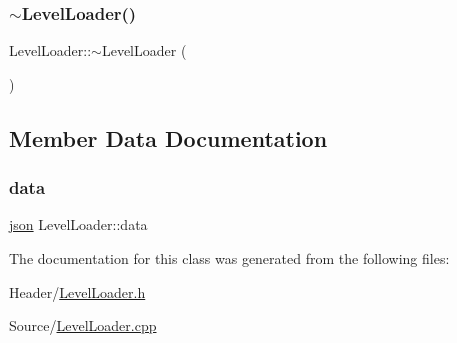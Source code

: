 \mbox{\label{class_level_loader_af91d5b5441640c5be1ef096e9dfb84e8}} 
\subsubsection{\texorpdfstring{$\sim$LevelLoader()}{~LevelLoader()}}
{\footnotesize\ttfamily Level\+Loader\+::$\sim$\+Level\+Loader (\begin{DoxyParamCaption}{ }\end{DoxyParamCaption})\hspace{0.3cm}{\ttfamily [inline]}}



\subsection{Member Data Documentation}
\mbox{\label{class_level_loader_a829b2c5c0b8f6a3247e2c89cbbcf280c}} 
\subsubsection{\texorpdfstring{data}{data}}
{\footnotesize\ttfamily \mbox{\hyperlink{_level_loader_8h_ab701e3ac61a85b337ec5c1abaad6742d}{json}} Level\+Loader\+::data}



The documentation for this class was generated from the following files\+:\begin{DoxyCompactItemize}
\item 
Header/\mbox{\hyperlink{_level_loader_8h}{Level\+Loader.\+h}}\item 
Source/\mbox{\hyperlink{_level_loader_8cpp}{Level\+Loader.\+cpp}}\end{DoxyCompactItemize}

